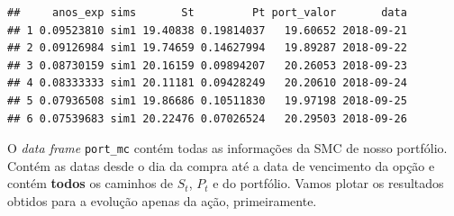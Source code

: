 \documentclass[]{book}
\newenvironment{Shaded}{\begin{snugshade}}{\end{snugshade}}
\newcommand{\KeywordTok}[1]{\textcolor[rgb]{0.13,0.29,0.53}{\textbf{#1}}}
\newcommand{\DataTypeTok}[1]{\textcolor[rgb]{0.13,0.29,0.53}{#1}}
\newcommand{\DecValTok}[1]{\textcolor[rgb]{0.00,0.00,0.81}{#1}}
\newcommand{\StringTok}[1]{\textcolor[rgb]{0.31,0.60,0.02}{#1}}
\newcommand{\OtherTok}[1]{\textcolor[rgb]{0.56,0.35,0.01}{#1}}
\newcommand{\OperatorTok}[1]{\textcolor[rgb]{0.81,0.36,0.00}{\textbf{#1}}}
\newcommand{\NormalTok}[1]{#1}
\theoremstyle{definition}
\theoremstyle{definition}
\theoremstyle{definition}
\theoremstyle{remark}
\begin{document}
\begin{verbatim}
##     anos_exp sims       St         Pt port_valor       data
## 1 0.09523810 sim1 19.40838 0.19814037   19.60652 2018-09-21
## 2 0.09126984 sim1 19.74659 0.14627994   19.89287 2018-09-22
## 3 0.08730159 sim1 20.16159 0.09894207   20.26053 2018-09-23
## 4 0.08333333 sim1 20.11181 0.09428249   20.20610 2018-09-24
## 5 0.07936508 sim1 19.86686 0.10511830   19.97198 2018-09-25
## 6 0.07539683 sim1 20.22476 0.07026524   20.29503 2018-09-26
\end{verbatim}

O \emph{data frame} \texttt{port\_mc} contém todas as informações da SMC
de nosso portfólio. Contém as datas desde o dia da compra até a data de
vencimento da opção e contém \textbf{todos} os caminhos de \(S_t\),
\(P_t\) e do portfólio. Vamos plotar os resultados obtidos para a
evolução apenas da ação, primeiramente.

\begin{Shaded}
\end{Shaded}
\end{document}
